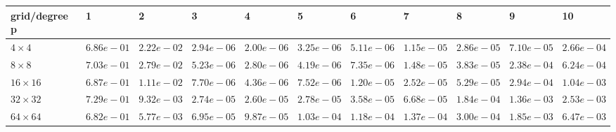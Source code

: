 \begin{tabular}{lllllllllll}
\hline
 grid/degree p   & 1          & 2          & 3          & 4          & 5          & 6          & 7          & 8          & 9          & 10         \\
\hline
 $4 \times 4$    & $6.86e-01$ & $2.22e-02$ & $2.94e-06$ & $2.00e-06$ & $3.25e-06$ & $5.11e-06$ & $1.15e-05$ & $2.86e-05$ & $7.10e-05$ & $2.66e-04$ \\
 $8 \times 8$    & $7.03e-01$ & $2.79e-02$ & $5.23e-06$ & $2.80e-06$ & $4.19e-06$ & $7.35e-06$ & $1.48e-05$ & $3.83e-05$ & $2.38e-04$ & $6.24e-04$ \\
 $16 \times 16$  & $6.87e-01$ & $1.11e-02$ & $7.70e-06$ & $4.36e-06$ & $7.52e-06$ & $1.20e-05$ & $2.52e-05$ & $5.29e-05$ & $2.94e-04$ & $1.04e-03$ \\
 $32 \times 32$  & $7.29e-01$ & $9.32e-03$ & $2.74e-05$ & $2.60e-05$ & $2.78e-05$ & $3.58e-05$ & $6.68e-05$ & $1.84e-04$ & $1.36e-03$ & $2.53e-03$ \\
 $64 \times 64$  & $6.82e-01$ & $5.77e-03$ & $6.95e-05$ & $9.87e-05$ & $1.03e-04$ & $1.18e-04$ & $1.37e-04$ & $3.00e-04$ & $1.85e-03$ & $6.47e-03$ \\
\hline
\end{tabular}